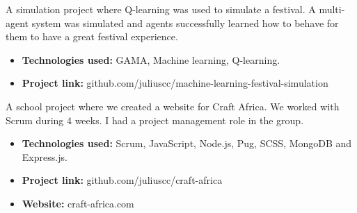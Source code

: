 \divider


A simulation project where Q-learning was used to simulate a festival. A multi-agent system was simulated and agents successfully learned how to behave for them to have a great festival experience.

\vspace{6pt}

\begin{itemize}
    \item \textbf{Technologies used:} GAMA, Machine learning, Q-learning.
    \item \textbf{Project link:} github.com/juliuscc/machine-learning-festival-simulation
\end{itemize}


\divider


A school project where we created a website for Craft Africa. We worked with Scrum during 4 weeks. I had a project management role in the group.

\vspace{6pt}

\begin{itemize}
    \item \textbf{Technologies used:} Scrum, JavaScript, Node.js, Pug, SCSS, MongoDB and Express.js.
    \item \textbf{Project link:} github.com/juliuscc/craft-africa
    \item \textbf{Website:} craft-africa.com
\end{itemize}
